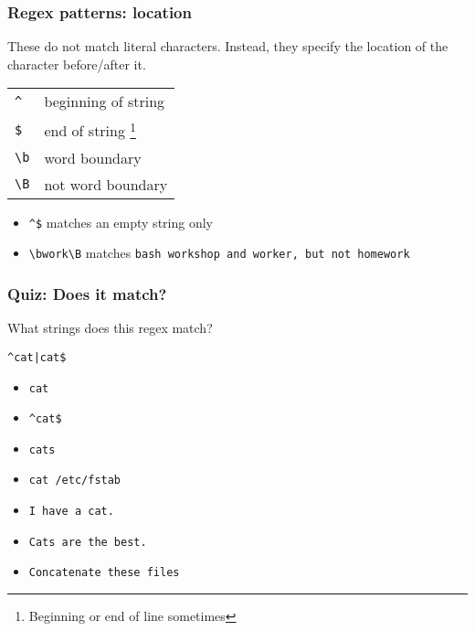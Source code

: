 \begin{frame}[fragile]
\frametitle{Regex patterns: location}
These do not match literal characters. Instead, they specify the location of
the character before/after it.
\begin{table}
    \centering
    \begin{tabular}{ll}
        \verb|^|            & beginning of string \\
        \verb|$|            & end of string \footnote{Beginning or end of line sometimes} \\
        \verb|\b|           & word boundary \\
        \verb|\B|           & not word boundary \\
    \end{tabular}
\end{table}

\begin{example}
    \begin{itemize}
        \item \verb|^$| matches an empty string only
        \item \verb|\bwork\B| matches \tt{bash workshop} and \tt{worker},
            but not \tt{homework}
    \end{itemize}
\end{example}
\end{frame}

\begin{frame}[fragile]
\frametitle{Quiz: Does it match?}
What strings does this regex match? \newline

\Large \verb!^cat|cat$! \normalsize

\begin{itemize}
    \item \verb|cat|                      %
    \item \verb|^cat$|                    %
    \item \verb|cats|                     %
    \item \verb|cat /etc/fstab|           %
    \item \verb|I have a cat.|            %
    \item \verb|Cats are the best.|       %
    \item \verb|Concatenate these files|  %
\end{itemize}
\end{frame}

